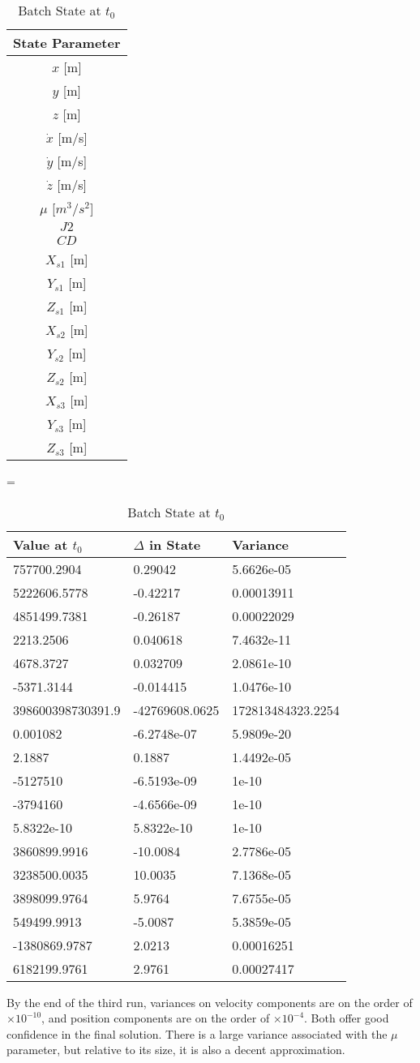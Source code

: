 \documentclass[12pt,a4paper,oneside]{article}
\numberwithin{equation}{section}   		%
\providecommand{\e}[1]{\ensuremath{\times 10^{#1}}}
\newcommand{\stateTableUnits}{		$x$	[m]\\\hline
							$y$ 		[m]\\\hline
							$z$ 		[m]\\\hline
							$\dot{x}$ 	[m/s]\\\hline
							$\dot{y}$ 	[m/s]\\\hline
							$\dot{z}$	[m/s]\\\hline
							$\mu$ 	[$m^3/s^2$]\\\hline
							$J2$ 		\\\hline
							$CD$		\\\hline
							$X_{s1}$  [m]	\\\hline
							$Y_{s1}$  [m]	\\\hline
							$Z_{s1}$	 [m]\\\hline
							$X_{s2}$  [m]	\\\hline
							$Y_{s2}$ 	 [m]\\\hline
							$Z_{s2}$	[m] \\\hline
							$X_{s3}$ 	[m] \\\hline
							$Y_{s3}$ 	 [m]\\\hline
							$Z_{s3}$  [m]
							}
\begin{document}
\begin{table}[H]
	\centering
	\begin{tabular}{|c|}
		\hline
		\textbf{State Parameter} \\\hline
		\stateTableUnits \\\hline
	\end{tabular}
	=
	\begin{tabular}{|l|l|l|}
		\hline
		\textbf{Value at} $t_0$ &	\textbf{$\Delta$ in State}	&	\textbf{Variance} \\\hline
		757700.2904&0.29042&5.6626e-05\\\hline
		5222606.5778&-0.42217&0.00013911\\\hline
		4851499.7381&-0.26187&0.00022029\\\hline
		2213.2506&0.040618&7.4632e-11\\\hline
		4678.3727&0.032709&2.0861e-10\\\hline
		-5371.3144&-0.014415&1.0476e-10\\\hline
		398600398730391.9&-42769608.0625&172813484323.2254\\\hline
		0.001082&-6.2748e-07&5.9809e-20\\\hline
		2.1887&0.1887&1.4492e-05\\\hline
		-5127510&-6.5193e-09&1e-10\\\hline
		-3794160&-4.6566e-09&1e-10\\\hline
		5.8322e-10&5.8322e-10&1e-10\\\hline
		3860899.9916&-10.0084&2.7786e-05\\\hline
		3238500.0035&10.0035&7.1368e-05\\\hline
		3898099.9764&5.9764&7.6755e-05\\\hline
		549499.9913&-5.0087&5.3859e-05\\\hline
		-1380869.9787&2.0213&0.00016251\\\hline
		6182199.9761&2.9761&0.00027417\\\hline
	\end{tabular}
	\caption{Batch State at $t_0$}
	\label{tab:Batch t0}
\end{table}

By the end of the third run, variances on velocity components are on the order of $\e{-10}$, and position components are on the order of $\e{-4}$. Both offer good confidence in the final solution. There is a large variance associated with the $\mu$ parameter, but relative to its size, it is also a decent approximation.
\end{document}
